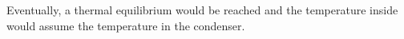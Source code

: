 Eventually, a thermal equilibrium would be reached and the temperature inside would assume the temperature in the condenser.